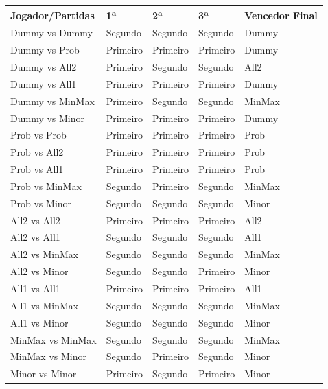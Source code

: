 \documentclass[12pt]{article}
\begin{document}
	\begin{center}
	    \begin{tabular}{ |p{4cm}|p{2cm}|p{2cm}|p{2cm}|p{4cm}|  }
	    \hline
	     Jogador/Partidas & 1ª & 2ª & 3ª & Vencedor Final \\\hline
         Dummy vs Dummy	& Segundo	& Segundo	& Segundo	& Dummy\\\hline
         Dummy vs Prob	& Primeiro	& Primeiro	& Primeiro	& Dummy\\\hline
         Dummy vs All2	& Primeiro	& Segundo	& Segundo	& All2\\\hline
         Dummy vs All1	& Primeiro	& Primeiro	& Primeiro	& Dummy\\\hline
         Dummy vs MinMax	& Primeiro	& Segundo	& Segundo	& MinMax\\\hline
         Dummy vs Minor	& Primeiro	& Primeiro	& Primeiro	& Dummy\\\hline
         Prob vs Prob	& Primeiro	& Primeiro	& Primeiro	& Prob\\\hline
         Prob vs All2	& Primeiro	& Primeiro	& Primeiro	& Prob\\\hline
         Prob vs All1	& Primeiro	& Primeiro	& Primeiro	& Prob\\\hline
         Prob vs MinMax	& Segundo	& Primeiro	& Segundo	& MinMax\\\hline
         Prob vs Minor	& Segundo	& Segundo	& Segundo	& Minor\\\hline
         All2 vs All2	& Primeiro	& Primeiro	& Primeiro	& All2\\\hline
         All2 vs All1	& Segundo	& Segundo	& Segundo	& All1\\\hline
         All2 vs MinMax	& Segundo	& Segundo	& Segundo	& MinMax\\\hline
         All2 vs Minor	& Segundo	& Segundo	& Primeiro	& Minor\\\hline
         All1 vs All1	& Primeiro	& Primeiro	& Primeiro	& All1\\\hline
         All1 vs MinMax	& Segundo	& Segundo	& Segundo	& MinMax\\\hline
         All1 vs Minor	& Segundo	& Segundo	& Segundo	& Minor\\\hline
         MinMax vs MinMax	& Segundo	& Segundo	& Segundo	& MinMax\\\hline
         MinMax vs Minor	& Segundo	& Primeiro	& Segundo	& Minor\\\hline
         Minor vs Minor	& Primeiro	& Segundo	& Primeiro	& Minor\\\hline
	    \end{tabular}
	\end{center}
	
\end{document}
